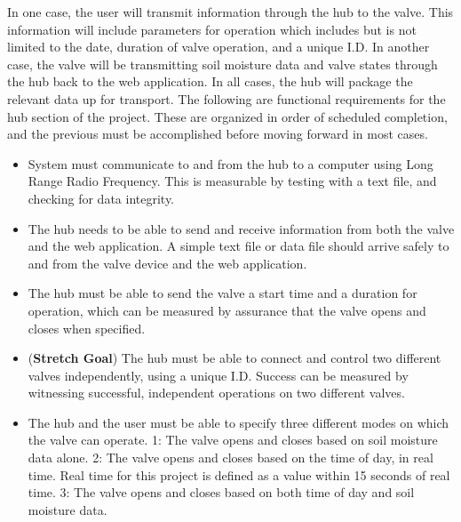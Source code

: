 \documentclass[onecolumn, draftclsnofoot,10pt, compsoc]{IEEEtran}
\newcounter{subsubsubsection}[subsubsection]
\newcounter{subsubsubsubsection}[subsubsubsection]
\begin{document}
      In one case, the user will transmit information through the hub to the valve. 
      This information will include parameters for operation which includes but is not limited to the date, duration of valve operation, and a unique I.D.
      In another case, the valve will be transmitting soil moisture data and valve states through the hub back to the web application. 
      In all cases, the hub will package the relevant data up for transport. 
     The following are functional requirements for the hub section of the project. 
     These are organized in order of scheduled completion, and the previous must be accomplished before moving forward in most cases.  
          \begin{itemize}
              \item{System must communicate to and from the hub to a computer using Long Range Radio Frequency. 
              This is measurable by testing with a text file, and checking for data integrity.}
              \item{The hub needs to be able to send and receive information from both the valve and the web application. 
              A simple text file or data file should arrive safely to and from the valve device and the web application.}
             \item{The hub must be able to send the valve a start time and a duration for operation, which can be measured by assurance that the valve opens and closes when specified.} 
              \item{(\textbf{Stretch Goal}) The hub must be able to connect and control two different valves independently, using a unique I.D. Success can be measured by witnessing successful, independent operations on two different valves.}
             \item{The hub and the user must be able to specify three different modes on which the valve can operate.
             1: The valve opens and closes based on soil moisture data alone.
             2: The valve opens and closes based on the time of day, in real time.
             Real time for this project is defined as a value within 15 seconds of real time.
             3: The valve opens and closes based on both time of day and soil moisture data.} 

\end{itemize}
\end{document}
